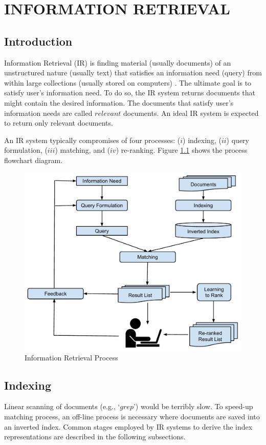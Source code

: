 


\chapter{\textbf{INFORMATION RETRIEVAL}}
\label{ch2}

\section{Introduction}

Information Retrieval (IR) is finding material (usually documents) of an unstructured nature (usually text) that satisfies an information need (query) from within large collections (usually stored on computers) \citep{irbook}.
The ultimate goal is to satisfy user's information need. 
To do so, the IR system returns documents that might contain the desired information.
The documents that satisfy user's information needs are called $relevant$ documents.
An ideal IR system is expected to return only relevant documents.

An IR system typically compromises of four processes: ($i$) indexing, ($ii$) query formulation, ($iii$) matching, and ($iv$) re-ranking.
Figure \ref{fig:irprocess} shows the process flowchart diagram.

\begin{figure}[!b]
\centering
\includegraphics[width=0.80\hsize]{IRProcess.pdf}
\caption{Information Retrieval Process}
\label{fig:irprocess}
\end{figure}

\section{Indexing}
Linear scanning of documents (e.g., `$grep$') would be terribly slow.
To speed-up matching process, an off-line process is necessary where documents are saved into an inverted index.
Common stages employed by IR systems to derive the index representations are described in the following subsections. 

